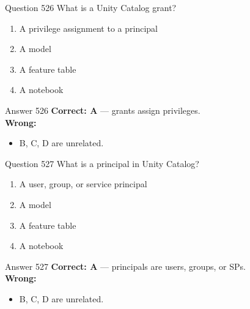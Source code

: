 \documentclass[aspectratio=169,11pt]{beamer}
\begin{document}
	\begin{frame}{Question 526}
		What is a Unity Catalog grant?
		\begin{enumerate}[label=\Alph*.]
			\item A privilege assignment to a principal
			\item A model
			\item A feature table
			\item A notebook
		\end{enumerate}
	\end{frame}
	\begin{frame}{Answer 526}
		\textbf{Correct: A} --- grants assign privileges.\\
		\vspace{0.5em}
		\textbf{Wrong:}
		\begin{itemize}
			\item B, C, D are unrelated.
		\end{itemize}
	\end{frame}
	
	\begin{frame}{Question 527}
		What is a principal in Unity Catalog?
		\begin{enumerate}[label=\Alph*.]
			\item A user, group, or service principal
			\item A model
			\item A feature table
			\item A notebook
		\end{enumerate}
	\end{frame}
	\begin{frame}{Answer 527}
		\textbf{Correct: A} --- principals are users, groups, or SPs.\\
		\vspace{0.5em}
		\textbf{Wrong:}
		\begin{itemize}
			\item B, C, D are unrelated.
		\end{itemize}
	\end{frame}
	
\end{document}
